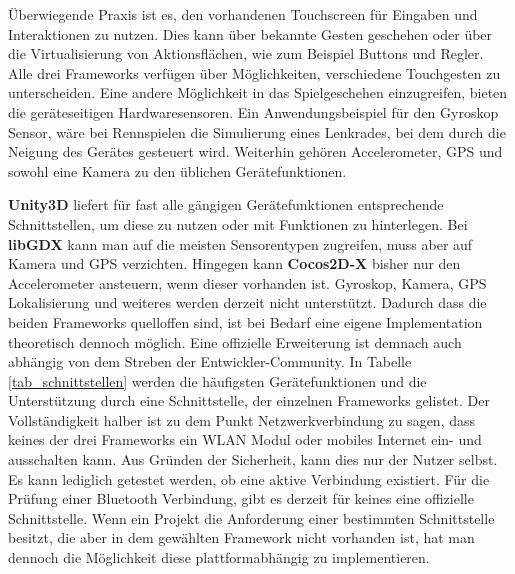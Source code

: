 \medskip
Überwiegende Praxis ist es, den vorhandenen Touchscreen für Eingaben und Interaktionen zu nutzen. Dies kann über bekannte Gesten geschehen oder über die Virtualisierung von Aktionsflächen, wie zum Beispiel Buttons und Regler. Alle drei Frameworks verfügen über Möglichkeiten, verschiedene Touchgesten zu unterscheiden.
Eine andere Möglichkeit in das Spielgeschehen einzugreifen, bieten die geräteseitigen Hardwaresensoren. Ein Anwendungsbeispiel für den Gyroskop Sensor, wäre bei Rennspielen die Simulierung eines Lenkrades, bei dem durch die Neigung des Gerätes gesteuert wird. Weiterhin gehören Accelerometer, GPS und sowohl eine Kamera zu den üblichen Gerätefunktionen.

\medskip
\textbf{Unity3D} liefert für fast alle gängigen Gerätefunktionen entsprechende Schnittstellen, um diese zu nutzen oder mit Funktionen zu hinterlegen. Bei \textbf{libGDX} kann man auf die meisten Sensorentypen zugreifen, muss aber auf Kamera und GPS verzichten.
Hingegen kann \textbf{Cocos2D-X} bisher nur den Accelerometer ansteuern, wenn dieser vorhanden ist. Gyroskop, Kamera, GPS Lokalisierung und weiteres werden derzeit nicht unterstützt. Dadurch dass die beiden Frameworks quelloffen sind, ist bei Bedarf eine eigene Implementation theoretisch dennoch möglich. Eine offizielle Erweiterung ist demnach auch abhängig von dem Streben der Entwickler-Community. 
In Tabelle \ref{tab_schnittstellen} werden die häufigsten Gerätefunktionen und die Unterstützung durch eine Schnittstelle, der einzelnen Frameworks gelistet. 
Der Vollständigkeit halber ist zu dem Punkt Netzwerkverbindung zu sagen, dass keines der drei Frameworks ein WLAN Modul oder mobiles Internet ein- und ausschalten kann. Aus Gründen der Sicherheit, kann dies nur der Nutzer selbst. Es kann lediglich getestet werden, ob eine aktive Verbindung existiert. Für die Prüfung einer Bluetooth Verbindung, gibt es derzeit für keines eine offizielle Schnittstelle. Wenn ein Projekt die Anforderung einer bestimmten Schnittstelle besitzt, die aber in dem gewählten Framework nicht vorhanden ist, hat man dennoch die Möglichkeit diese plattformabhängig zu implementieren.

